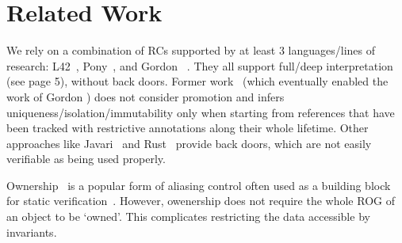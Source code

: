 \section[Related Work]{Related Work\protect\footnotemark{}}
\label{s:related}
%
We rely on a combination of RCs supported by at least 3 languages/lines of research:
L42~\cite{ServettoZucca15,ServettoEtAl13a,JOT:issue_2011_01/article1,GianniniEtAl16},
Pony~\cite{clebsch2015deny,clebsch2017orca}, and Gordon \etal~\cite{GordonEtAl12}.
They all support full/deep interpretation (see page 5), without back doors.
Former work~\cite{Boyland10,boyland2003checking,Hogg91,Smith:2000:AT:645394.651903,DBLP:conf/pldi/AikenFKT03} (which eventually enabled the work of Gordon \etal)  does not consider promotion and 
infers uniqueness/isolation/immutability only when starting from references that have been tracked with restrictive annotations along their whole lifetime.
Other approaches like Javari~\cite{TschantzErnst05,Boyland06}
and Rust~\cite{matsakis2014rust}
provide back doors, which are not easily verifiable as being used properly.

Ownership~\cite{ClarkeEtAl13,ZibinEtAl10,DietlEtAl07} is a popular form of aliasing control often used as a building block for static verification~\cite{%
muller2002modular,%
barnett2011specification%
}.  However, owenership does not require the whole ROG of an object to be `owned'. This complicates restricting the data accessible by invariants.

